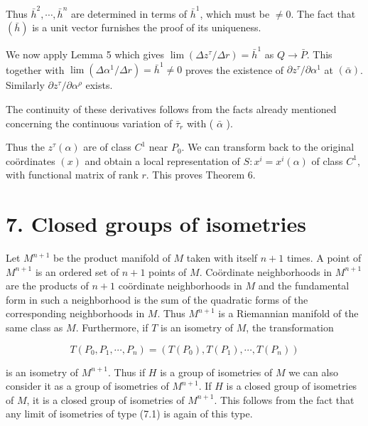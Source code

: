 \documentclass[10pt]{article}
\begin{document}
Thus $\bar{h}^{2}, \cdots, \bar{h}^{n}$ are determined in terms of $\bar{h}^{1}$, which must be $\neq 0$. The fact that $(\bar{h})$ is a unit vector furnishes the proof of its uniqueness.

We now apply Lemma 5 which gives $\lim \left(\Delta z^{\tau} / \Delta r\right)=\bar{h}^{1}$ as $Q \rightarrow \bar{P}$. This together with $\lim \left(\Delta \alpha^{1} / \Delta r\right)=\bar{h}^{1} \neq 0$ proves the existence of $\partial z^{\tau} / \partial \alpha^{1}$ at $(\bar{\alpha})$. Similarly $\partial z^{\tau} / \partial \alpha^{\rho}$ exists.

The continuity of these derivatives follows from the facts already mentioned concerning the continuous variation of $\bar{\tau}_{r}$ with ( $\bar{\alpha}$ ).

Thus the $z^{\tau}(\alpha)$ are of class $C^{1}$ near $P_{0}$. We can transform back to the original coördinates $(x)$ and obtain a local representation of $S: x^{i}=x^{i}(\alpha)$ of class $C^{1}$, with functional matrix of rank $r$. This proves Theorem 6.

\section*{7. Closed groups of isometries}
Let $M^{n+1}$ be the product manifold of $M$ taken with itself $n+1$ times. A point of $M^{n+1}$ is an ordered set of $n+1$ points of $M$. Coördinate neighborhoods in $M^{n+1}$ are the products of $n+1$ coördinate neighborhoods in $M$ and the fundamental form in such a neighborhood is the sum of the quadratic forms of the corresponding neighborhoods in $M$. Thus $M^{n+1}$ is a Riemannian manifold of the same class as $M$. Furthermore, if $T$ is an isometry of $M$, the transformation


\begin{equation*}
T\left(P_{0}, P_{1}, \cdots, P_{n}\right)=\left(T\left(P_{0}\right), T\left(P_{1}\right), \cdots, T\left(P_{n}\right)\right) \tag{7.1}
\end{equation*}


is an isometry of $M^{n+1}$. Thus if $H$ is a group of isometries of $M$ we can also consider it as a group of isometries of $M^{n+1}$. If $H$ is a closed group of isometries of $M$, it is a closed group of isometries of $M^{n+1}$. This follows from the fact that any limit of isometries of type (7.1) is again of this type.
\end{document}
